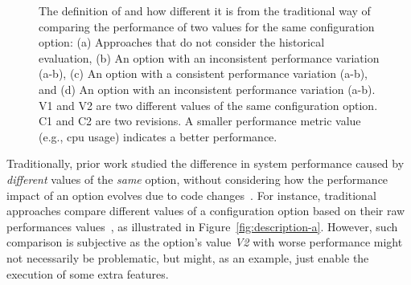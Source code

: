 \begin{figure}[t]
\begin{subfigure}{0.25\textwidth}
                \label{fig:description-d}
        \end{subfigure}%
	\caption{  The definition of \inconsistent and how different it is from the traditional way of comparing the performance of two values for the same configuration option: (a) Approaches that do not consider the historical evaluation, (b) An option with an inconsistent performance variation (a-b), (c) An option with a consistent performance variation (a-b), and (d) An option with an inconsistent performance variation (a-b). V1 and V2 are two different values of the same configuration option. C1 and C2 are two revisions. A smaller performance metric value (e.g., cpu usage) indicates a better performance.
	}
	\label{fig:description}
\end{figure}



Traditionally, prior work studied the difference in system performance caused by \emph{different} values of the \emph{same} option, without considering how the performance impact of an option evolves due to code changes~\cite{tse}. For instance, traditional approaches compare different values of a configuration option based on their raw performances values~\cite{RN2880,RN3537,RN3543}, as illustrated in Figure~\ref{fig:description-a}. However, such comparison is subjective as
the option's value \emph{V2} with worse performance might not necessarily be problematic, but might, as an example, just enable the execution of some extra features.

